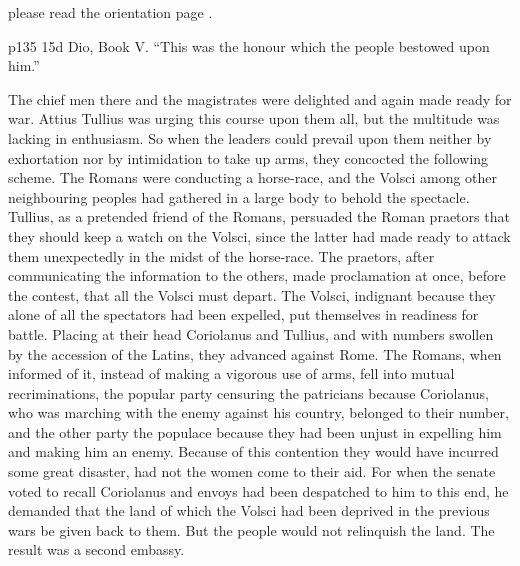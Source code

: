 please read the orientation page .

p135
15d
Dio, Book V. ``This was the honour which the people bestowed upon him.''

The chief men there and the magistrates were delighted and again made ready for war. Attius Tullius was urging this course upon them all, but the multitude was lacking in enthusiasm. So when the leaders could prevail upon them neither by exhortation nor by intimidation to take up arms, they concocted the following scheme. The Romans were conducting a horse-race, and the Volsci among other neighbouring peoples had gathered in a large body to behold the spectacle. Tullius, as a pretended friend of the Romans, persuaded the Roman praetors that they should keep a watch on the Volsci, since the latter had made ready to attack them unexpectedly in the midst of the horse-race. The praetors, after communicating the information to the others, made proclamation at once, before the contest, that all the Volsci must depart. The Volsci, indignant because they alone of all the spectators had been expelled, put themselves in readiness for battle. Pla­cing at their head Coriolanus and Tullius, and with numbers swollen by the accession of the Latins, they advanced against Rome. The Romans, when informed of it, instead of making a vigorous use of arms, fell into mutual recriminations, the popular party censuring the patricians because Coriolanus, who was marching with the enemy against his country, belonged to their number, and the other party the populace because they had been unjust in expelling him and making him an enemy. Because of this contention they would have incurred some great disaster, had not the women come to their aid. For when the senate voted to recall Coriolanus and envoys had been despatched to him to this end, he demanded that the land of which the Volsci had been deprived in the previous wars be given back to them. But the people would not relinquish the land. The result was a second embassy.

